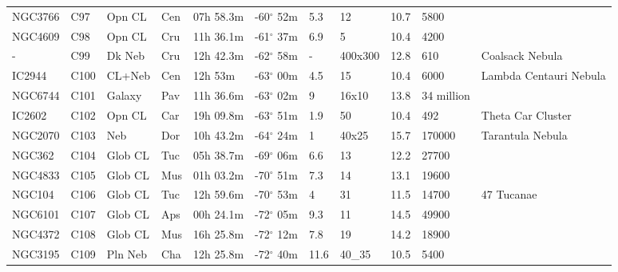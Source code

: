 \begin{longtable}{@{}lllllllllll@{}}
NGC3766    & C97           & Opn CL  & Cen & 07h 58.3m & -60$^{\circ}$ 52m & 5.3  & 12             & 10.7 & 5800          &                                 \\
NGC4609    & C98           & Opn CL  & Cru & 11h 36.1m & -61$^{\circ}$ 37m & 6.9  & 5              & 10.4 & 4200          &                                 \\
-          & C99           & Dk Neb  & Cru & 12h 42.3m & -62$^{\circ}$ 58m & -    & 400x300        & 12.8 & 610           & Coalsack Nebula                 \\
IC2944     & C100          & CL+Neb  & Cen & 12h 53m   & -63$^{\circ}$ 00m & 4.5  & 15             & 10.4 & 6000          & Lambda Centauri Nebula          \\
NGC6744    & C101          & Galaxy  & Pav & 11h 36.6m & -63$^{\circ}$ 02m & 9    & 16x10          & 13.8 & 34 million    &                                 \\
IC2602     & C102          & Opn CL  & Car & 19h 09.8m & -63$^{\circ}$ 51m & 1.9  & 50             & 10.4 & 492           & Theta Car Cluster               \\
NGC2070    & C103          & Neb     & Dor & 10h 43.2m & -64$^{\circ}$ 24m & 1    & 40x25          & 15.7 & 170000        & Tarantula Nebula                \\
NGC362     & C104          & Glob CL & Tuc & 05h 38.7m & -69$^{\circ}$ 06m & 6.6  & 13             & 12.2 & 27700         &                                 \\
NGC4833    & C105          & Glob CL & Mus & 01h 03.2m & -70$^{\circ}$ 51m & 7.3  & 14             & 13.1 & 19600         &                                 \\
NGC104     & C106          & Glob CL & Tuc & 12h 59.6m & -70$^{\circ}$ 53m & 4    & 31             & 11.5 & 14700         & 47 Tucanae                      \\
NGC6101    & C107          & Glob CL & Aps & 00h 24.1m & -72$^{\circ}$ 05m & 9.3  & 11             & 14.5 & 49900         &                                 \\
NGC4372    & C108          & Glob CL & Mus & 16h 25.8m & -72$^{\circ}$ 12m & 7.8  & 19             & 14.2 & 18900         &                                 \\
NGC3195    & C109          & Pln Neb & Cha & 12h 25.8m & -72$^{\circ}$ 40m & 11.6 & 40\_35         & 10.5 & 5400          &                                 \\
\hline
\end{longtable}




